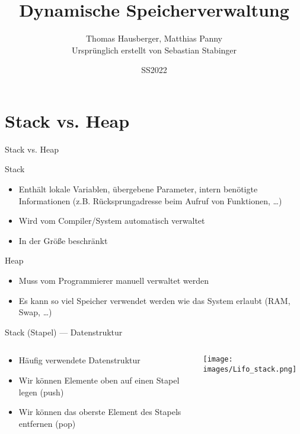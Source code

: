 \documentclass[presentation]{beamer}
\author{Thomas Hausberger, Matthias Panny \\ Ursprünglich erstellt von Sebastian Stabinger}
\date{SS2022}
\title{Dynamische Speicherverwaltung}
\begin{document}
\maketitle

\section{Stack vs. Heap}
\label{sec:org4ebd915}
\begin{frame}[label={sec:org24c6a08}]{Stack vs. Heap}
\begin{block}{Stack}
\begin{itemize}
\item Enthält lokale Variablen, übergebene Parameter, intern benötigte
Informationen (z.B. Rücksprungadresse beim Aufruf von Funktionen, \ldots{})
\item Wird vom Compiler/System \alert{automatisch verwaltet}
\item In der Größe beschränkt
\end{itemize}
\end{block}
\begin{block}{Heap}
\begin{itemize}
\item Muss vom Programmierer manuell verwaltet werden
\item Es kann so viel Speicher verwendet werden wie das System erlaubt
(RAM, Swap, \ldots{})
\end{itemize}
\end{block}
\end{frame}
\begin{frame}[label={sec:orgcc50d90}]{Stack (Stapel) --- Datenstruktur}
\begin{columns}
\begin{column}{0.4\columnwidth}
\begin{itemize}
\item Häufig verwendete Datenstruktur
\item Wir können Elemente oben auf einen Stapel legen (push)
\item Wir können das oberste Element des Stapels entfernen (pop)
\end{itemize}
\end{column}
\begin{column}{0.6\columnwidth}
\begin{center}
\texttt{[image: images/Lifo\_stack.png]}
\end{center}
\end{column}
\end{columns}
\end{frame}
\end{document}
